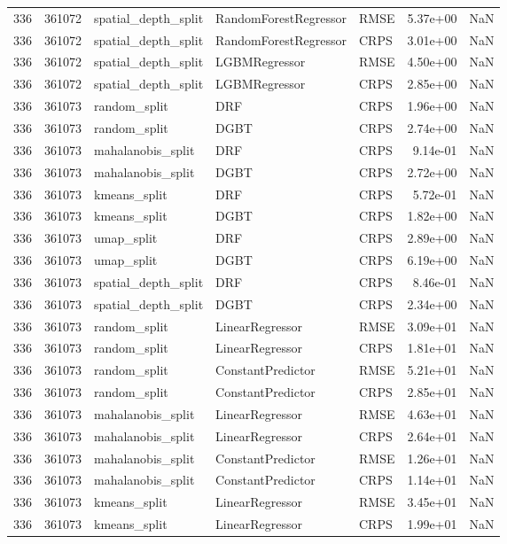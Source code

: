 \begin{tabular}{rrlllrr}
336 & 361072 & spatial\_depth\_split & RandomForestRegressor & RMSE & 5.37e+00 & NaN \\
336 & 361072 & spatial\_depth\_split & RandomForestRegressor & CRPS & 3.01e+00 & NaN \\
336 & 361072 & spatial\_depth\_split & LGBMRegressor & RMSE & 4.50e+00 & NaN \\
336 & 361072 & spatial\_depth\_split & LGBMRegressor & CRPS & 2.85e+00 & NaN \\
336 & 361073 & random\_split & DRF & CRPS & 1.96e+00 & NaN \\
336 & 361073 & random\_split & DGBT & CRPS & 2.74e+00 & NaN \\
336 & 361073 & mahalanobis\_split & DRF & CRPS & 9.14e-01 & NaN \\
336 & 361073 & mahalanobis\_split & DGBT & CRPS & 2.72e+00 & NaN \\
336 & 361073 & kmeans\_split & DRF & CRPS & 5.72e-01 & NaN \\
336 & 361073 & kmeans\_split & DGBT & CRPS & 1.82e+00 & NaN \\
336 & 361073 & umap\_split & DRF & CRPS & 2.89e+00 & NaN \\
336 & 361073 & umap\_split & DGBT & CRPS & 6.19e+00 & NaN \\
336 & 361073 & spatial\_depth\_split & DRF & CRPS & 8.46e-01 & NaN \\
336 & 361073 & spatial\_depth\_split & DGBT & CRPS & 2.34e+00 & NaN \\
336 & 361073 & random\_split & LinearRegressor & RMSE & 3.09e+01 & NaN \\
336 & 361073 & random\_split & LinearRegressor & CRPS & 1.81e+01 & NaN \\
336 & 361073 & random\_split & ConstantPredictor & RMSE & 5.21e+01 & NaN \\
336 & 361073 & random\_split & ConstantPredictor & CRPS & 2.85e+01 & NaN \\
336 & 361073 & mahalanobis\_split & LinearRegressor & RMSE & 4.63e+01 & NaN \\
336 & 361073 & mahalanobis\_split & LinearRegressor & CRPS & 2.64e+01 & NaN \\
336 & 361073 & mahalanobis\_split & ConstantPredictor & RMSE & 1.26e+01 & NaN \\
336 & 361073 & mahalanobis\_split & ConstantPredictor & CRPS & 1.14e+01 & NaN \\
336 & 361073 & kmeans\_split & LinearRegressor & RMSE & 3.45e+01 & NaN \\
336 & 361073 & kmeans\_split & LinearRegressor & CRPS & 1.99e+01 & NaN \\

\end{tabular}
